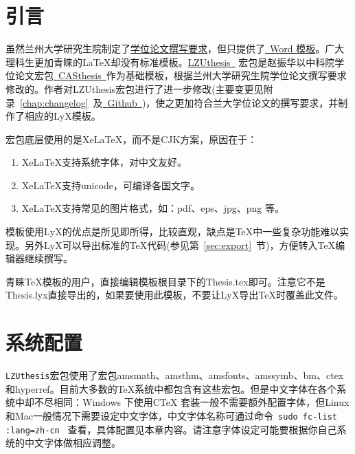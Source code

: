 \documentclass[twoside,longtitle]{LZUthesis}
\begin{document}
\tableofcontents{}


\mainmatter

\pagestyle{lzu}


\chapter{引言\label{chap:intro}}

虽然兰州大学研究生院制定了\href{http://ge.lzu.edu.cn/degree/xwsq/lwgf/201103/1186.htm}{学位论文撰写要求}，但只提供了\href{http://ge.lzu.edu.cn/degree/xwsq/lwgf/201103/1187.htm}{~Word 模板}。广大理科生更加青睐的\LaTeX{}却没有标准模板。\href{http://blog.sciencenet.cn/home.php?mod=space&uid=117412&do=blog&id=512804}{LZUthesis~} 宏包是赵振华以中科院学位论文宏包\href{http://www.ctex.org/PackageCASthesis}{~CASthesis~}作为基础模板，根据兰州大学研究生院学位论文撰写要求修改的。作者对LZUthesis宏包进行了进一步修改(主要变更见附录~\ref{chap:changelog}~及\href{https://github.com/mosesnow/LZUthesis/commits/master}{~Github~})，使之更加符合兰大学位论文的撰写要求，并制作了相应的LyX模板。

宏包底层使用的是Xe\LaTeX{}，而不是CJK方案，原因在于：
\begin{enumerate}
\item Xe\LaTeX{}支持系统字体，对中文友好。
\item Xe\LaTeX{}支持unicode，可编译各国文字。
\item Xe\LaTeX{}支持常见的图片格式，如：pdf、eps、jpg、png 等。
\end{enumerate}


模板使用LyX的优点是所见即所得，比较直观，缺点是\TeX{}中一些复杂功能难以实现。另外LyX可以导出标准的\TeX{}代码(参见第~\ref{sec:export}~节)，方便转入\TeX{}编辑器继续撰写。

青睐\TeX{}模板的用户，直接编辑模板根目录下的Thesis.tex即可。注意它不是Thesis.lyx直接导出的，如果要使用此模板，不要让LyX导出\TeX{}时覆盖此文件。


\chapter{系统配置}

\texttt{LZUthesis}宏包使用了宏包amsmath、amsthm、amsfonts、amssymb、bm、ctex 和hyperref。目前大多数的\TeX{}系统中都包含有这些宏包。但是中文字体在各个系统中却不尽相同：Windows 下使用C\TeX{} 套装一般不需要额外配置字体，但Linux 和Mac一般情况下需要设定中文字体，中文字体名称可通过命令~\lstinline!sudo fc-list :lang=zh-cn!~ 查看，具体配置见本章内容。请注意字体设定可能要根据你自己系统的中文字体做相应调整。
\end{document}
